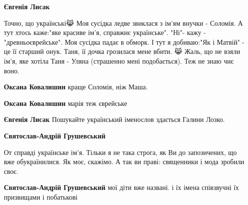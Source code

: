 \begin{itemize}
\begin{itemize}
\textbf{Євгенія Лисак} 

Точно, що українські😹 Моя сусідка ледве звиклася з ім'ям внучки - Соломія. А
тут хтось каже:"яке красиве ім'я, справжнє українське". "Ні"- кажу -
"древньоєврейське". Моя сусідка падає в обморк. І тут я добиваю:"Як і Матвій" -
це її старший онук. Таня, її дочка грозилася мене вбити. 😹 Жаль, що не взяли
ім'я, яке хотіла Таня - Уляна (страшенно мені подобається). Теж не знаю чиє
воно.


 
\textbf{Оксана Ковалишин} краще Соломія, ніж Маша.

 
\textbf{Оксана Ковалишин} марія теж єврейське

 
\textbf{Євгенія Лисак} Пошукайте український іменослов здається Галини Лозко.

 
\textbf{Святослав-Андрій Грушевський} 

От справді українське ім'я. Тільки я не така строга, як Ви до запозичених, що
вже обукраїнилися. Як моє, скажімо. А так ви праві: священники і мода зробили
своє.


 
\textbf{Святослав-Андрій Грушевський} мої діти вже названі. і їх імена співзвучні їх призвищами і побатькові


\end{itemize}
\end{itemize}
